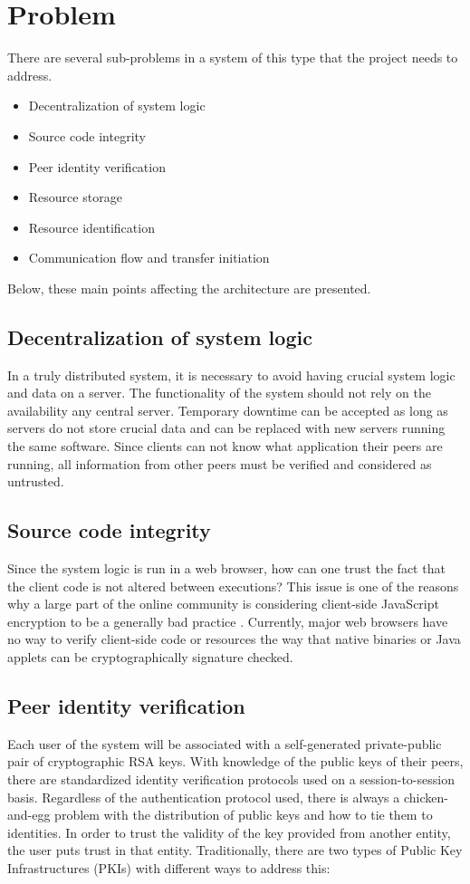 \section{Problem}
\label{sec:problem}

There are several sub-problems in a system of this type that the project needs to address.

\begin{itemize}
\item Decentralization of system logic
\item Source code integrity
\item Peer identity verification
\item Resource storage
\item Resource identification
\item Communication flow and transfer initiation
\end{itemize}

Below, these main points affecting the architecture are presented.

\subsection{Decentralization of system logic}
In a truly distributed system, it is necessary to avoid having crucial system logic and data on a server. The functionality of the system should not rely on the availability any central server. Temporary downtime can be accepted as long as servers do not store crucial data and can be replaced with new servers running the same software. Since clients can not know what application their peers are running, all information from other peers must be verified and considered as untrusted.

\subsection{Source code integrity}
Since the system logic is run in a web browser, how can one trust the fact that the client code is not altered between executions? This issue is one of the reasons why a large part of the online community is considering client-side JavaScript encryption to be a generally bad practice \cite{Matasano:Online}. Currently, major web browsers have no way to verify client-side code or resources the way that native binaries or Java applets can be cryptographically signature checked.

\subsection{Peer identity verification}
Each user of the system will be associated with a self-generated private-public pair of cryptographic RSA keys. With knowledge of the public keys of their peers, there are standardized identity verification protocols used on a session-to-session basis. Regardless of the authentication protocol used, there is always a chicken-and-egg problem with the distribution of public keys and how to tie them to identities. In order to trust the validity of the key provided from another entity, the user puts trust in that entity. Traditionally, there are two types of Public Key Infrastructures (PKIs) with different ways to address this:


